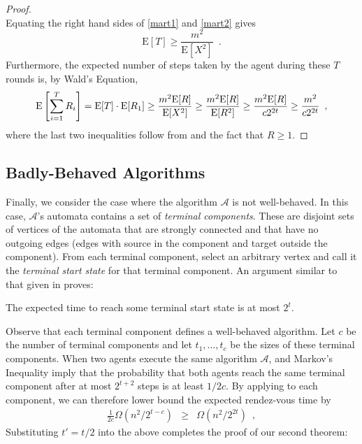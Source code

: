 \documentclass[lotsofwhite]{patmorin}
\newcommand{\E}{\mathrm{E}}
\begin{document}
\begin{proof}
\begin{equation}
\end{equation}
Equating the right hand sides of \eqref{mart1} and \eqref{mart2} gives 
\[
   \E[T] \ge \frac{m^2}{\E[X^2]} \enspace .
\]
Furthermore, the expected number of steps taken by the agent during
these $T$ rounds is, by Wald's Equation, 
\begin{equation}
  \E\left[\sum_{i=1}^T R_i\right] 
    =  \E[T]\cdot\E[R_1] 
    \ge \frac{m^2 \E[R]}{\E[X^2]} 
    \ge \frac{m^2 \E[R]}{\E[R^2]}
    \ge \frac{m^2 \E[R]}{c2^{2t}} 
    \ge \frac{m^2}{c2^{2t}} 
   \enspace ,  \eqlabel{gap}
\end{equation}
where the last two inequalities follow from  and the
fact that $R\ge 1$.
\end{proof}

\subsection{Badly-Behaved Algorithms}

Finally, we consider the case where the algorithm $\mathcal{A}$ is not
well-behaved.  In this case, $\mathcal{A}$'s automata contains a set
of \emph{terminal components}.  These are disjoint sets of vertices of the
automata that are strongly connected and that have no outgoing edges (edges
with source in the component and target outside the component). From each 
terminal component, select an arbitrary vertex and call it
the \emph{terminal start state} for that terminal component.
An argument similar to that given in  proves:

\begin{lem}
The expected time to reach some terminal start state is at most $2^t$.
\end{lem}

Observe that each terminal component defines a well-behaved algorithm.
Let $c$ be the number of terminal components and let $t_1,\ldots,t_c$ be
the sizes of these terminal components.  When two agents execute the same
algorithm $\mathcal{A}$,  and Markov's Inequality
imply that the probability
that both agents reach the same terminal component after at most $2^{t+2}$
steps is at least $1/2c$.  By applying  to each component, we can therefore lower bound the expected rendez-vous time by
\begin{eqnarray*}
  \frac{1}{2c}\Omega(n^2/2^{t-c})
    & \ge & \Omega(n^2/2^{2t}) \enspace ,
\end{eqnarray*}
Substituting $t'=t/2$ into the above completes the proof of our second theorem:
\end{document}
